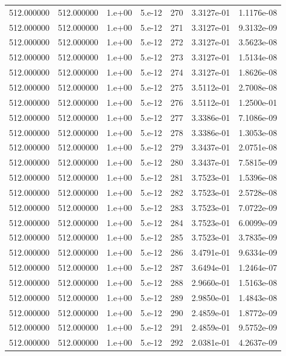 \begin{table}[htbp]
\begin{tabular}{rrrrrrr}
512.000000 & 512.000000 & 1.e+00 & 5.e-12 & 270 & 3.3127e-01 & 1.1176e-08 \\
512.000000 & 512.000000 & 1.e+00 & 5.e-12 & 271 & 3.3127e-01 & 9.3132e-09 \\
512.000000 & 512.000000 & 1.e+00 & 5.e-12 & 272 & 3.3127e-01 & 3.5623e-08 \\
512.000000 & 512.000000 & 1.e+00 & 5.e-12 & 273 & 3.3127e-01 & 1.5134e-08 \\
512.000000 & 512.000000 & 1.e+00 & 5.e-12 & 274 & 3.3127e-01 & 1.8626e-08 \\
512.000000 & 512.000000 & 1.e+00 & 5.e-12 & 275 & 3.5112e-01 & 2.7008e-08 \\
512.000000 & 512.000000 & 1.e+00 & 5.e-12 & 276 & 3.5112e-01 & 1.2500e-01 \\
512.000000 & 512.000000 & 1.e+00 & 5.e-12 & 277 & 3.3386e-01 & 7.1086e-09 \\
512.000000 & 512.000000 & 1.e+00 & 5.e-12 & 278 & 3.3386e-01 & 1.3053e-08 \\
512.000000 & 512.000000 & 1.e+00 & 5.e-12 & 279 & 3.3437e-01 & 2.0751e-08 \\
512.000000 & 512.000000 & 1.e+00 & 5.e-12 & 280 & 3.3437e-01 & 7.5815e-09 \\
512.000000 & 512.000000 & 1.e+00 & 5.e-12 & 281 & 3.7523e-01 & 1.5396e-08 \\
512.000000 & 512.000000 & 1.e+00 & 5.e-12 & 282 & 3.7523e-01 & 2.5728e-08 \\
512.000000 & 512.000000 & 1.e+00 & 5.e-12 & 283 & 3.7523e-01 & 7.0722e-09 \\
512.000000 & 512.000000 & 1.e+00 & 5.e-12 & 284 & 3.7523e-01 & 6.0099e-09 \\
512.000000 & 512.000000 & 1.e+00 & 5.e-12 & 285 & 3.7523e-01 & 3.7835e-09 \\
512.000000 & 512.000000 & 1.e+00 & 5.e-12 & 286 & 3.4791e-01 & 9.6334e-09 \\
512.000000 & 512.000000 & 1.e+00 & 5.e-12 & 287 & 3.6494e-01 & 1.2464e-07 \\
512.000000 & 512.000000 & 1.e+00 & 5.e-12 & 288 & 2.9660e-01 & 1.5163e-08 \\
512.000000 & 512.000000 & 1.e+00 & 5.e-12 & 289 & 2.9850e-01 & 1.4843e-08 \\
512.000000 & 512.000000 & 1.e+00 & 5.e-12 & 290 & 2.4859e-01 & 1.8772e-09 \\
512.000000 & 512.000000 & 1.e+00 & 5.e-12 & 291 & 2.4859e-01 & 9.5752e-09 \\
512.000000 & 512.000000 & 1.e+00 & 5.e-12 & 292 & 2.0381e-01 & 4.2637e-09 \\

\end{tabular}
\end{table}
